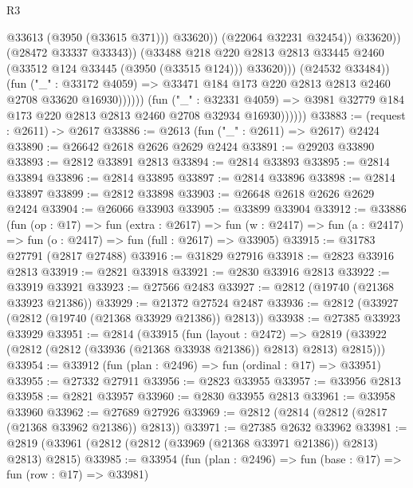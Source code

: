 \begin{lexlean}{R3}
\begin{coremodule}
                                            @33613
                                            (@3950 (@33615 @371)))
                                          @33620))
                                      (@22064 @32231 @32454))
                                    @33620))
                                (@28472 @33337 @33343))
                              (@33488
                                @218
                                @220
                                @2813
                                @2813
                                @33445
                                @2460
                                (@33512 @124 @33445 (@3950 (@33515 @124)))
                                @33620)))
                          (@24532 @33484))
                        (fun ("_" : @33172 @4059) =>
                        @33471 @184 @173 @220 @2813 @2813 @2460 @2708 @33620 @16930))))))
              (fun ("_" : @32331 @4059) =>
              @3981 @32779 @184 @173 @220 @2813 @2813 @2460 @2708 @32934 @16930))))))
@33883 := (request : @2611) -> @2617
@33886 := @2613 (fun ("_" : @2611) => @2617) @2424
@33890 := @26642 @2618 @2626 @2629 @2424
@33891 := @29203 @33890
@33893 := @2812 @33891 @2813
@33894 := @2814 @33893
@33895 := @2814 @33894
@33896 := @2814 @33895
@33897 := @2814 @33896
@33898 := @2814 @33897
@33899 := @2812 @33898
@33903 := @26648 @2618 @2626 @2629 @2424
@33904 := @26066 @33903
@33905 := @33899 @33904
@33912 := @33886
    (fun (op : @17) =>
    fun (extra : @2617) =>
    fun (w : @2417) => fun (a : @2417) => fun (o : @2417) => fun (full : @2617) => @33905)
@33915 := @31783 @27791 (@2817 @27488)
@33916 := @31829 @27916
@33918 := @2823 @33916 @2813
@33919 := @2821 @33918
@33921 := @2830 @33916 @2813
@33922 := @33919 @33921
@33923 := @27566 @2483
@33927 := @2812 (@19740 (@21368 @33923 @21386))
@33929 := @21372 @27524 @2487
@33936 := @2812 (@33927 (@2812 (@19740 (@21368 @33929 @21386)) @2813))
@33938 := @27385 @33923 @33929
@33951 := @2814
    (@33915
      (fun (layout : @2472) =>
      @2819 (@33922 (@2812 (@2812 (@33936 (@21368 @33938 @21386)) @2813) @2813) @2815)))
@33954 := @33912 (fun (plan : @2496) => fun (ordinal : @17) => @33951)
@33955 := @27332 @27911
@33956 := @2823 @33955
@33957 := @33956 @2813
@33958 := @2821 @33957
@33960 := @2830 @33955 @2813
@33961 := @33958 @33960
@33962 := @27689 @27926
@33969 := @2812 (@2814 (@2812 (@2817 (@21368 @33962 @21386)) @2813))
@33971 := @27385 @2632 @33962
@33981 := @2819 (@33961 (@2812 (@2812 (@33969 (@21368 @33971 @21386)) @2813) @2813) @2815)
@33985 := @33954 (fun (plan : @2496) => fun (base : @17) => fun (row : @17) => @33981)

\end{coremodule}
\end{lexlean}
